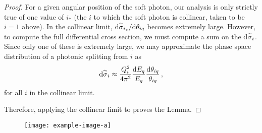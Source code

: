 \begin{proof}
    For a given angular position of the soft photon, our analysis is only strictly true of one value of \(i_*\) (the \(i\) to which the soft photon is collinear, taken to be \(i=1\) above).
    In the collinear limit, \(\dd\overset{\sim}{\sigma}_{i_*}/\dd\theta_{iq}\) becomes extremely large.
    However, to compute the full differential cross section, we must compute a sum on the \(\dd\overset{\sim}{\sigma}_i\).
    Since only one of these is extremely large, we may approximate the phase space distribution of a photonic splitting from \(i\) as
     \begin{align}
         \label{eq:collinear-photon-emission}
        \dsigmatilde_i
        \approx
        \frac{Q_i^2}{4\pi^2}
        \frac{\dd E_q}{E_q}
        \frac{\dd\theta_{iq}}{\theta_{iq}}
        \,,
    \end{align}
    for all \(i\) in the collinear limit.

    Therefore, applying the collinear limit to  proves the Lemma.
\end{proof}


\begin{figure}[]
    \centering
    \texttt{[image: example-image-a]}
    \caption[A cartoon depicting charge coherence in QED. ]{%
    }
    \label{fig:qed-coherent-branching}
\end{figure}



\vspace{7pt}

